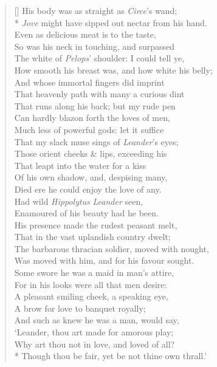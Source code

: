\documentclass[MAIN]{subfiles}
\begin{document}
\begin{verse}[\versewidth]
His body was as straight as \emph{Circe}'s wand;\\*
\emph{Jove} might have sipped out nectar from his hand.\\
Even as delicious meat is to the taste,\\
So was his neck in touching, and surpassed\\
The white of \emph{Pelops}' shoulder: I could tell ye,\\
How smooth his breast was, and how white his belly;\\
And whose immortal fingers did imprint\\
That heavenly path with many a curious dint\\
That runs along his back; but my rude pen\\
Can hardly blazon forth the loves of men,\\
Much less of powerful gods: let it suffice\\
That my slack muse sings of \emph{Leander}'s eyes;\\
Those orient cheeks \& lips, exceeding his\\
That leapt into the water for a kiss\\
Of his own shadow, and, despising many,\\
Died ere he could enjoy the love of any.\\
Had wild \emph{Hippolytus} \emph{Leander} seen,\\
Enamoured of his beauty had he been.\\
His presence made the rudest peasant melt,\\
That in the vast uplandish country dwelt;\\
The barbarous thracian soldier, moved with nought,\\
Was moved with him, and for his favour sought.\\
Some swore he was a maid in man's attire,\\
For in his looks were all that men desire:\\
A pleasant smiling cheek, a speaking eye,\\
A brow for love to banquet royally;\\
And such as knew he was a man, would say,\\
`Leander, thou art made for amorous play;\\
Why art thou not in love, and loved of all?\\*
Though thou be fair, yet be not thine own thrall.'
\end{verse}
\end{document}

